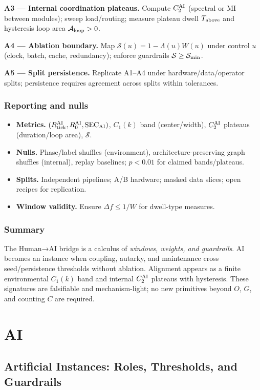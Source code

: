\documentclass[12pt,a4paper,oneside]{scrreprt}
\begin{document}
\textbf{A3 — Internal coordination plateaus.}
Compute $C_2^{\rm AI}$ (spectral or MI between modules); sweep load/routing; measure plateau dwell $T_{\rm above}$ and hysteresis loop area $\mathcal A_{\rm loop}>0$.

\textbf{A4 — Ablation boundary.}
Map $\mathcal S(u)=1-\Lambda(u)W(u)$ under control $u$ (clock, batch, cache, redundancy); enforce guardrails $\mathcal S\ge\mathcal S_{\rm min}$.

\textbf{A5 — Split persistence.}
Replicate A1–A4 under hardware/data/operator splits; persistence requires agreement across splits within tolerances.

\section{Reporting and nulls}\label{sec:ai-report}
\begin{itemize}
\item \textbf{Metrics.} $(R_{\rm tick}^{\rm AI}, R_0^{\rm AI}, \mathrm{SEC}_{\rm AI})$, $C_1(k)$ band (center/width), $C_2^{\rm AI}$ plateaus (duration/loop area), $\mathcal S$.
\item \textbf{Nulls.} Phase/label shuffles (environment), architecture-preserving graph shuffles (internal), replay baselines; $p<0.01$ for claimed bands/plateaus.
\item \textbf{Splits.} Independent pipelines; A/B hardware; masked data slices; open recipes for replication.
\item \textbf{Window validity.} Ensure $\Delta f\le 1/W$ for dwell-type measures.
\end{itemize}

\section*{Summary}
The Human→AI bridge is a calculus of \emph{windows, weights, and guardrails}. 
AI becomes an instance when coupling, autarky, and maintenance cross seed/persistence thresholds without ablation. 
Alignment appears as a finite environmental $C_1(k)$ band and internal $C_2^{\rm AI}$ plateaus with hysteresis. 
These signatures are falsifiable and mechanism-light; no new primitives beyond $O$, $G$, and counting $C$ are required.

\part{AI}

\chapter{Artificial Instances: Roles, Thresholds, and Guardrails}\label{ch:ai-core}
\end{document}
